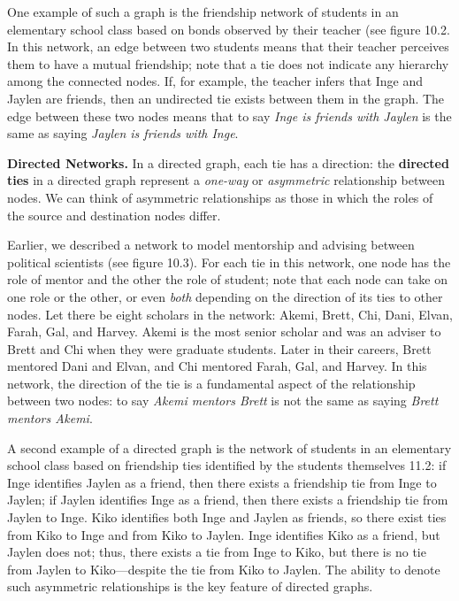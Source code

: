 \documentclass{book}
\begin{document}
One example of such a graph is the friendship network of students in an
elementary school class based on bonds observed by their teacher (see figure
10.2. In this network, an edge between two students means that their teacher
perceives them to have a mutual friendship; note that a tie does not indicate
any hierarchy among the connected nodes. If, for example, the teacher infers
that Inge and Jaylen are friends, then an undirected tie exists between them
in the graph. The edge between these two nodes means that to say \emph{Inge is
friends with Jaylen} is the same as saying \emph{Jaylen is friends with Inge}.

\textbf{Directed Networks.} In a directed graph, each tie has a direction: the
\textbf{directed ties} in a directed graph represent a \emph{one-way} or
\emph{asymmetric} relationship between nodes. We can think of asymmetric
relationships as those in which the roles of the source and destination nodes
differ.

Earlier, we described a network to model mentorship and advising between
political scientists (see figure 10.3). For each tie in this network, one node
has the role of mentor and the other the role of student; note that each node
can take on one role or the other, or even \emph{both} depending on the
direction of its ties to other nodes. Let there be eight scholars in the
network: Akemi, Brett, Chi, Dani, Elvan, Farah, Gal, and Harvey. Akemi is the
most senior scholar and was an adviser to Brett and Chi when they were
graduate students. Later in their careers, Brett mentored Dani and Elvan, and
Chi mentored Farah, Gal, and Harvey. In this network, the direction of the tie
is a fundamental aspect of the relationship between two nodes: to say
\emph{Akemi mentors Brett} is not the same as saying \emph{Brett mentors
Akemi}.

A second example of a directed graph is the network of students in an
elementary school class based on friendship ties identified by the students
themselves 11.2: if Inge identifies Jaylen as a friend, then there exists a
friendship tie from Inge to Jaylen; if Jaylen identifies Inge as a friend,
then there exists a friendship tie from Jaylen to Inge. Kiko identifies both
Inge and Jaylen as friends, so there exist ties from Kiko to Inge and from
Kiko to Jaylen. Inge identifies Kiko as a friend, but Jaylen does not; thus,
there exists a tie from Inge to Kiko, but there is no tie from Jaylen to
Kiko---despite the tie from Kiko to Jaylen. The ability to denote such
asymmetric relationships is the key feature of directed graphs.
\end{document}
